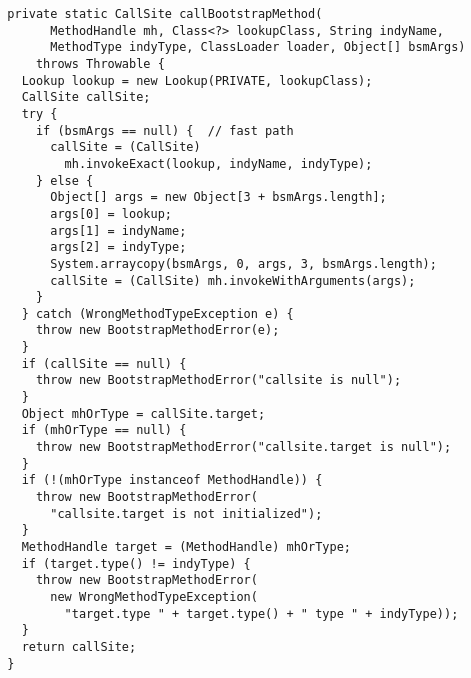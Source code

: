 {\scriptsize \begin{verbatim}
  private static CallSite callBootstrapMethod(
        MethodHandle mh, Class<?> lookupClass, String indyName,
        MethodType indyType, ClassLoader loader, Object[] bsmArgs)
      throws Throwable {
    Lookup lookup = new Lookup(PRIVATE, lookupClass);
    CallSite callSite;
    try {
      if (bsmArgs == null) {  // fast path
        callSite = (CallSite)
          mh.invokeExact(lookup, indyName, indyType);
      } else {
        Object[] args = new Object[3 + bsmArgs.length];
        args[0] = lookup;
        args[1] = indyName;
        args[2] = indyType;
        System.arraycopy(bsmArgs, 0, args, 3, bsmArgs.length);
        callSite = (CallSite) mh.invokeWithArguments(args);
      }
    } catch (WrongMethodTypeException e) {
      throw new BootstrapMethodError(e);
    }
    if (callSite == null) {
      throw new BootstrapMethodError("callsite is null");
    }
    Object mhOrType = callSite.target;
    if (mhOrType == null) {
      throw new BootstrapMethodError("callsite.target is null");
    }
    if (!(mhOrType instanceof MethodHandle)) {
      throw new BootstrapMethodError(
        "callsite.target is not initialized");
    }
    MethodHandle target = (MethodHandle) mhOrType;
    if (target.type() != indyType) {
      throw new BootstrapMethodError(
        new WrongMethodTypeException(
          "target.type " + target.type() + " type " + indyType));
    }
    return callSite;
  }
\end{verbatim} }
